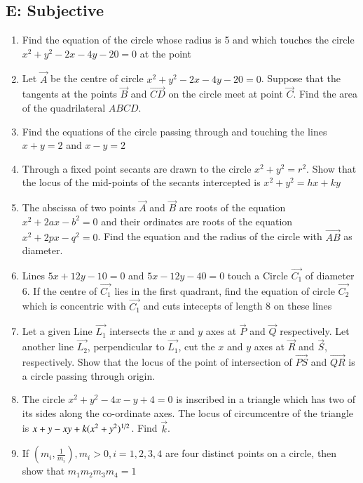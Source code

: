 \documentclass[journal,12pt,twocolumn]{IEEEtran}
\theoremstyle{remark}
\begin{document}
\subsection*{E: Subjective}
\begin{enumerate}
\item Find the equation of the circle whose radius is 5 and which touches the circle $x^2+y^2-2x-4y-20=0$ at the point 
\hfill{}
\item Let $\vec{A}$ be the centre of circle $x^2+y^2-2x-4y-20=0$. Suppose that the tangents at the points $\vec{B}$ and $\vec{CD}$  on the circle meet at point $\vec{C}$. Find the area of the quadrilateral $ABCD$.
\hfill{}
\item Find the equations of the circle passing through  and touching the lines $x+y=2$ and $x-y=2$
\hfill{}
\item Through a fixed point  secants are drawn to the circle $x^2+y^2=r^2$. Show that the locus of the mid-points of the secants intercepted is $x^2+y^2=hx+ky$
\hfill{}
\item The abscissa of two points $\vec{A}$ and $\vec{B}$ are roots of the equation $x^2+2ax-b^2=0$ and their ordinates are roots of the equation $x^2+2px-q^2=0$. Find the equation and the radius of the circle with $\vec{AB}$ as diameter.
\hfill{}
\item Lines $5x+12y-10=0$ and $5x-12y-40=0$ touch a Circle $\vec{C_1}$ of diameter 6. If the centre of $\vec{C_1}$ lies in the first quadrant, find the equation of circle $\vec{C_2}$ which is concentric with $\vec{C_1}$ and cuts intecepts of length 8 on these lines
\hfill{}
\item Let a given Line $\vec{L_1}$ intersects the $x$ and $y$ axes at $\vec{P}$ and $\vec{Q}$ respectively. Let another line $\vec{L_2}$, perpendicular to $\vec{L_1}$, cut the $x$ and $y$ axes at $\vec{R}$ and $\vec{S}$, respectively. Show that the locus of the point of intersection of $\vec{PS}$ and $\vec{QR}$ is a circle passing through origin.
\hfill{}
\item The circle $x^2+y^2-4x-y+4=0$ is inscribed in a triangle which has two of its sides along the co-ordinate axes. The locus of circumcentre of the triangle is $x+y-xy+k(x^2+y^2)\textsuperscript{1/2}$. Find $\vec{k}$.
\hfill{}
\item If $\left( m_i, \frac{1}{m_i} \right), m_i > 0, i = 1, 2, 3, 4$ are four distinct points on a circle, then show that $m_1m_2m_3m_4=1$

\end{enumerate}
\end{document}
